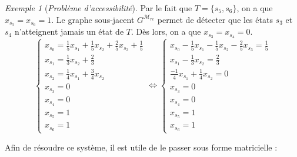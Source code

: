 \documentclass[12pt,a4paper]{report}
\theoremstyle{definition}
\theoremstyle{remark}
\newtheorem{example}{Exemple}[chapter]
\begin{document}
\begin{example}[\textit{Problème d'accessibilité}]
Par le fait que $T = \{s_5, s_6\}$, on a que $x_{s_5} = x_{s_6} = 1$. Le graphe sous-jacent $G^{\mathcal{M}_{re}}$ permet de détecter que %
les états $s_3$ et $s_4$ n'atteignent jamais un état de $T$. Dès lors, on a que $x_{s_3} = x_{s_4} = 0$.
\[
	\begin{cases}
		x_{s_0} = \frac{1}{5} x_{s_1} + \frac{1}{5} x_{s_2} + \frac{2}{5} x_{s_3} + \frac{1}{5} \\
		x_{s_1} = \frac{1}{3} x_{s_2} + \frac{2}{3} \\
		x_{s_2} = \frac{1}{4} x_{s_1} + \frac{3}{4} x_{s_2} \\
		x_{s_3} = 0 \\
		x_{s_4} = 0 \\
		x_{s_5} = 1 \\
		x_{s_6} = 1
	\end{cases}
	\iff
	\begin{cases}
	x_{s_0} - \frac{1}{5} x_{s_1} - \frac{1}{5} x_{s_2} - \frac{2}{5} x_{s_3} = \frac{1}{5} \\
	x_{s_1} - \frac{1}{3} x_{s_2} = \frac{2}{3} \\
	\frac{-1}{4} x_{s_1} + \frac{1}{4} x_{s_2} = 0 \\
	x_{s_3} = 0 \\
	x_{s_4} = 0 \\
	x_{s_5} = 1 \\
	x_{s_6} = 1 
	\end{cases}
\]

Afin de résoudre ce système, il est utile de le passer sous forme matricielle :


\end{example}
\end{document}
